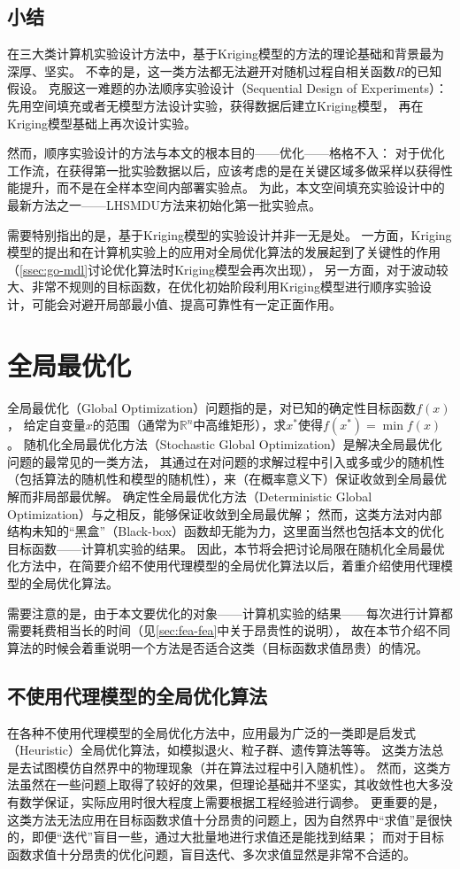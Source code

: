 \documentclass[index]{subfiles}
\begin{document}
\subsection{小结}
在三大类计算机实验设计方法中，基于Kriging模型的方法的理论基础和背景最为深厚、坚实。
不幸的是，这一类方法都无法避开对随机过程自相关函数$R$的已知假设。
克服这一难题的办法顺序实验设计（Sequential Design of Experiments）：
先用空间填充或者无模型方法设计实验，获得数据后建立Kriging模型，
再在Kriging模型基础上再次设计实验。

然而，顺序实验设计的方法与本文的根本目的——优化——格格不入：
对于优化工作流，在获得第一批实验数据以后，应该考虑的是在关键区域多做采样以获得性能提升，而不是在全样本空间内部署实验点。
为此，本文空间填充实验设计中的最新方法之一——LHSMDU方法来初始化第一批实验点。

需要特别指出的是，基于Kriging模型的实验设计并非一无是处。
一方面，Kriging模型的提出和在计算机实验上的应用对全局优化算法的发展起到了关键性的作用（\cref{ssec:go-mdl}讨论优化算法时Kriging模型会再次出现），
另一方面，对于波动较大、非常不规则的目标函数，在优化初始阶段利用Kriging模型进行顺序实验设计，可能会对避开局部最小值、提高可靠性有一定正面作用。

\section{全局最优化}\label{sec:go}
全局最优化（Global Optimization）问题指的是，对已知的确定性目标函数$f(x)$，
给定自变量$x$的范围（通常为$\mathbb{R}^n$中高维矩形），求$x^\ast$使得$f(x^\ast)=\min f(x)$。
随机化全局最优化方法（Stochastic Global Optimization）是解决全局最优化问题的最常见的一类方法，
其通过在对问题的求解过程中引入或多或少的随机性（包括算法的随机性和模型的随机性），来（在概率意义下）保证收敛到全局最优解而非局部最优解。\cite{zhigljavsky2007}
确定性全局最优化方法（Deterministic Global Optimization）与之相反，能够保证收敛到全局最优解；
然而，这类方法对内部结构未知的“黑盒”（Black-box）函数却无能为力，这里面当然也包括本文的优化目标函数——计算机实验的结果。
因此，本节将会把讨论局限在随机化全局最优化方法中，在简要介绍不使用代理模型的全局优化算法以后，着重介绍使用代理模型的全局优化算法。

需要注意的是，由于本文要优化的对象——计算机实验的结果——每次进行计算都需要耗费相当长的时间（见\cref{sec:fea-fea}中关于昂贵性的说明），
故在本节介绍不同算法的时候会着重说明一个方法是否适合这类（目标函数求值昂贵）的情况。

\subsection{不使用代理模型的全局优化算法}
在各种不使用代理模型的全局优化方法中，应用最为广泛的一类即是启发式（Heuristic）全局优化算法，如模拟退火、粒子群、遗传算法等等。
这类方法总是去试图模仿自然界中的物理现象（并在算法过程中引入随机性）。
然而，这类方法虽然在一些问题上取得了较好的效果，但理论基础并不坚实，其收敛性也大多没有数学保证，实际应用时很大程度上需要根据工程经验进行调参\cite{zhigljavsky2007}。
更重要的是，这类方法无法应用在目标函数求值十分昂贵的问题上，因为自然界中“求值”是很快的，即便“迭代”盲目一些，通过大批量地进行求值还是能找到结果；
而对于目标函数求值十分昂贵的优化问题，盲目迭代、多次求值显然是非常不合适的。
\end{document}
